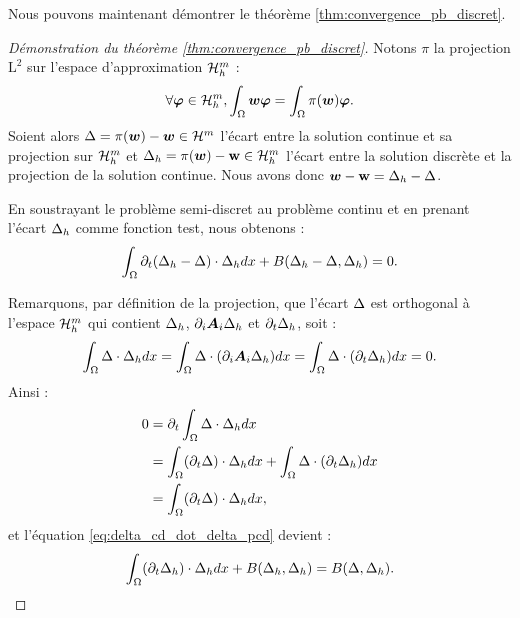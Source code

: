 Nous pouvons maintenant démontrer le théorème \ref{thm:convergence_pb_discret}.

\begin{proof}[Démonstration du théorème \ref{thm:convergence_pb_discret}]
	Notons $\pi$ la projection $\mathrm{L}^2$ sur l'espace d'approximation $\mathcal{H}_h^m$ :
	\begin{align}
		\forall  \bm{\varphi} \in  \mathcal{H}_h^m,
		\int_{\Omega} \bm{w} \bm{\varphi} = \int_{\Omega} \pi (\bm{w}) \bm{\varphi} .
	\end{align}
	Soient alors $\Delta = \pi(\bm{w}) - \bm{w} \in \mathcal{H}^m$ l'écart entre la solution
	continue et sa projection sur $\mathcal{H}_h^m$
	et $\Delta_h = \pi(\bm{w}) - \bm{\mathrm{w}} \in \mathcal{H}_h^m$ l'écart entre la solution
	discrète et la projection de la solution continue.
	Nous avons donc $\bm{w} - \bm{\mathrm{w}} = \Delta_h - \Delta$.
	
	En soustrayant le problème semi-discret au problème continu et en prenant
	l'écart $\Delta_h$ comme fonction test, nous obtenons :
	\begin{align} \label{eq:delta_cd_dot_delta_pcd}
		\int_{\Omega} \partial_{t} (\Delta_h - \Delta) \cdot \Delta_h dx
		+ B(\Delta_h - \Delta,\Delta_h) = 0 .
	\end{align}
	
	Remarquons, par définition de la projection, que l'écart $\Delta$
	est orthogonal à l'espace $\mathcal{H}_h^m$ qui contient $\Delta_h$,
	$\partial_{i} \bm{A}_{i} \Delta_h$ et $\partial_{t} \Delta_h$, soit :
	\begin{align}
		\int_{\Omega} \Delta \cdot \Delta_h dx =
		\int_{\Omega} \Delta \cdot (\partial_{i} \bm{A}_{i} \Delta_h) dx =
		\int_{\Omega} \Delta \cdot (\partial_{t} \Delta_h) dx = 0 .
	\end{align}
	Ainsi :
	\begin{equation}
		\begin{aligned}
			0 &= \partial_{t} \int_{\Omega} \Delta \cdot \Delta_h dx \\
			&= \int_{\Omega} (\partial_{t} \Delta) \cdot \Delta_h dx
			+ \int_{\Omega} \Delta \cdot (\partial_{t} \Delta_h) dx \\
			&= \int_{\Omega} (\partial_{t} \Delta) \cdot \Delta_h dx ,
		\end{aligned}
	\end{equation}
	et l'équation \eqref{eq:delta_cd_dot_delta_pcd} devient :
	\begin{align}
		\int_{\Omega} (\partial_{t} \Delta_h) \cdot \Delta_h dx
		+ B(\Delta_h,\Delta_h) = B(\Delta,\Delta_h) .
	\end{align}
	

\end{proof}
